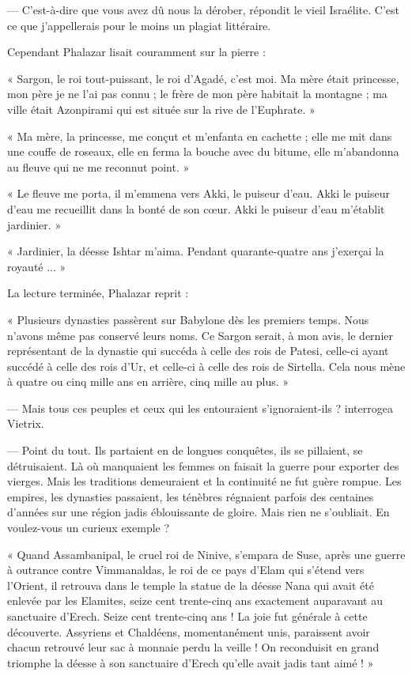 \documentclass[a4paper, 11pt, oneside, polutonikogreek, french]{article}
\begin{document}
--- C'est-à-dire que vous avez dû nous la dérober, répondit le vieil Israélite. C'est ce que j'appellerais pour le moins un plagiat littéraire.

Cependant Phalazar lisait couramment sur la pierre :

« Sargon, le roi tout-puissant, le roi d'Agadé, c'est moi. Ma mère était princesse, mon père je ne l'ai pas connu ; le frère de mon père habitait la montagne ; ma ville était Azonpirami qui est située sur la rive de l'Euphrate. »

« Ma mère, la princesse, me conçut et m'enfanta en cachette ; elle me mit dans une couffe de roseaux, elle en ferma la bouche avec du bitume, elle m'abandonna au fleuve qui ne me reconnut point. »

« Le fleuve me porta, il m'emmena vers Akki, le puiseur d'eau. Akki le puiseur d'eau me recueillit dans la bonté de son cœur. Akki le puiseur d'eau m'établit jardinier. »

« Jardinier, la déesse Ishtar m'aima. Pendant quarante-quatre ans j'exerçai la royauté ... »

\bigskip
\centerline{\EightStarTaper}
\centerline{\EightStarTaper\EightStarTaper}
\bigskip

La lecture terminée, Phalazar reprit :

« Plusieurs dynasties passèrent sur Babylone dès les premiers temps. Nous n'avons même pas conservé leurs noms. Ce Sargon serait, à mon avis, le dernier représentant de la dynastie qui succéda à celle des rois de Patesi, celle-ci ayant succédé à celle des rois d'Ur, et celle-ci à celle des rois de Sirtella. Cela nous mène à quatre ou cinq mille ans en arrière, cinq mille au plus. »

--- Mais tous ces peuples et ceux qui les entouraient s'ignoraient-ils ? interrogea Vietrix.

--- Point du tout. Ils partaient en de longues conquêtes, ils se pillaient, se détruisaient. Là où manquaient les femmes on faisait la guerre pour exporter des vierges. Mais les traditions demeuraient et la continuité ne fut guère rompue. Les empires, les dynasties passaient, les ténèbres régnaient parfois des centaines d'années sur une région jadis éblouissante de gloire. Mais rien ne s'oubliait. En voulez-vous un curieux exemple ?

« Quand Assambanipal, le cruel roi de Ninive, s'empara de Suse, après une guerre à outrance contre Vimmanaldas, le roi de ce pays d'Elam qui s'étend vers l'Orient, il retrouva dans le temple la statue de la déesse Nana qui avait été enlevée par les Elamites, seize cent trente-cinq ans exactement auparavant au sanctuaire d'Erech. Seize cent trente-cinq ans ! La joie fut générale à cette découverte. Assyriens et Chaldéens, momentanément unis, paraissent avoir chacun retrouvé leur sac à monnaie perdu la veille ! On reconduisit en grand triomphe la déesse à son sanctuaire d'Erech qu'elle avait jadis tant aimé ! »
\end{document}
